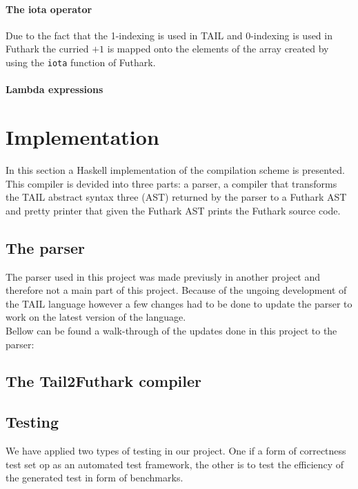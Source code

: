 \documentclass[11pt]{article}
\begin{document}
\paragraph{The iota operator} 
Due to the fact that the 1-indexing is used in TAIL and 0-indexing is used in Futhark the curried $+1$ is mapped onto the elements of the array created by using the {\tt iota} function of Futhark. 

\paragraph{Lambda expressions} 

\section{Implementation}
\label{sec:impl}
In this section a Haskell implementation of the compilation scheme is presented. This compiler is devided into three parts: a parser, a compiler that transforms the TAIL abstract syntax three (AST) returned by the parser to a Futhark AST and pretty printer that given the Futhark AST prints the Futhark source code. 

\subsection{The parser}
The parser used in this project was made previusly in another project \cite{APLACC} and therefore not a main part of this project. Because of the ungoing development of the TAIL language however a few changes had to be done to update the parser to work on the latest version of the language. \\

Bellow can be found a walk-through of the updates done in this project to the parser: \\

\subsection{The Tail2Futhark compiler}

\subsection{Testing}
We have applied two types of testing in our project. One if a form of correctness test set op as an automated test
framework, the other is to test the efficiency of the generated test in form of benchmarks. 
\end{document}
